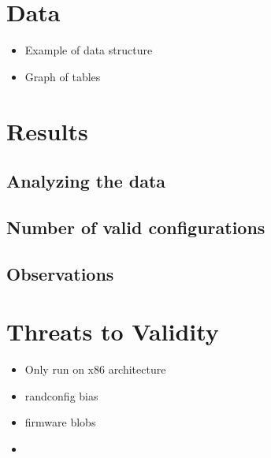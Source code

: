 \documentclass[a4paper,11pt]{article}
\begin{document}
\newpage
\section{Data}

\begin{itemize}
    \item Example of data structure
    \item Graph of tables
\end{itemize}




\newpage
\section{Results}

\subsection{Analyzing the data}

\subsection{Number of valid configurations}

\subsection{Observations}




\newpage
\section{Threats to Validity}

\begin{itemize}
    \item Only run on x86 architecture
    \item randconfig bias
    \item firmware blobs
    \item 
\end{itemize}
\end{document}
